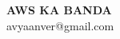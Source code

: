 \documentclass[11pt]{article}
\begin{document}
\begin{center}
{\LARGE \textbf{AWS KA BANDA}} \\[4pt]

avyaanver@gmail.com  \quad

\end{center}
\end{document}
